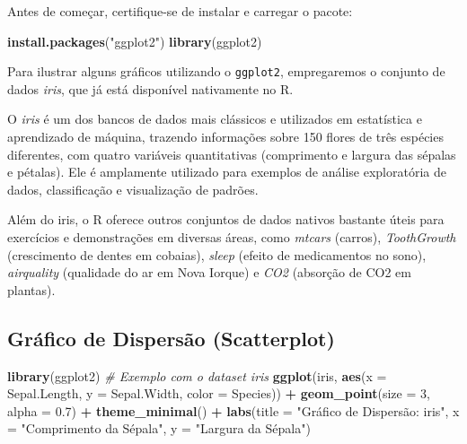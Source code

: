 \documentclass[
]{book}
\newenvironment{Shaded}{\begin{snugshade}}{\end{snugshade}}
\newcommand{\AttributeTok}[1]{\textcolor[rgb]{0.13,0.29,0.53}{#1}}
\newcommand{\CommentTok}[1]{\textcolor[rgb]{0.56,0.35,0.01}{\textit{#1}}}
\newcommand{\DecValTok}[1]{\textcolor[rgb]{0.00,0.00,0.81}{#1}}
\newcommand{\FloatTok}[1]{\textcolor[rgb]{0.00,0.00,0.81}{#1}}
\newcommand{\FunctionTok}[1]{\textcolor[rgb]{0.13,0.29,0.53}{\textbf{#1}}}
\newcommand{\NormalTok}[1]{#1}
\newcommand{\SpecialCharTok}[1]{\textcolor[rgb]{0.81,0.36,0.00}{\textbf{#1}}}
\newcommand{\StringTok}[1]{\textcolor[rgb]{0.31,0.60,0.02}{#1}}
\begin{document}
Antes de começar, certifique-se de instalar e carregar o pacote:

\begin{Shaded}
\begin{Highlighting}[]
\FunctionTok{install.packages}\NormalTok{(}\StringTok{"ggplot2"}\NormalTok{)}
\FunctionTok{library}\NormalTok{(ggplot2)}
\end{Highlighting}
\end{Shaded}

Para ilustrar alguns gráficos utilizando o \texttt{ggplot2}, empregaremos o conjunto de dados \emph{iris}, que já está disponível nativamente no R.

O \emph{iris} é um dos bancos de dados mais clássicos e utilizados em estatística e aprendizado de máquina, trazendo informações sobre 150 flores de três espécies diferentes, com quatro variáveis quantitativas (comprimento e largura das sépalas e pétalas). Ele é amplamente utilizado para exemplos de análise exploratória de dados, classificação e visualização de padrões.

Além do iris, o R oferece outros conjuntos de dados nativos bastante úteis para exercícios e demonstrações em diversas áreas, como \emph{mtcars} (carros), \emph{ToothGrowth} (crescimento de dentes em cobaias), \emph{sleep} (efeito de medicamentos no sono), \emph{airquality} (qualidade do ar em Nova Iorque) e \emph{CO2} (absorção de CO2 em plantas).

\subsection{Gráfico de Dispersão (Scatterplot)}\label{gruxe1fico-de-dispersuxe3o-scatterplot}

\begin{Shaded}
\begin{Highlighting}[]
\FunctionTok{library}\NormalTok{(ggplot2)}
\CommentTok{\# Exemplo com o dataset iris}
\FunctionTok{ggplot}\NormalTok{(iris, }\FunctionTok{aes}\NormalTok{(}\AttributeTok{x =}\NormalTok{ Sepal.Length, }\AttributeTok{y =}\NormalTok{ Sepal.Width, }\AttributeTok{color =}\NormalTok{ Species)) }\SpecialCharTok{+}
  \FunctionTok{geom\_point}\NormalTok{(}\AttributeTok{size =} \DecValTok{3}\NormalTok{, }\AttributeTok{alpha =} \FloatTok{0.7}\NormalTok{) }\SpecialCharTok{+}
  \FunctionTok{theme\_minimal}\NormalTok{() }\SpecialCharTok{+}
  \FunctionTok{labs}\NormalTok{(}\AttributeTok{title =} \StringTok{"Gráfico de Dispersão: iris"}\NormalTok{,}
       \AttributeTok{x =} \StringTok{"Comprimento da Sépala"}\NormalTok{,}
       \AttributeTok{y =} \StringTok{"Largura da Sépala"}\NormalTok{)}
\end{Highlighting}
\end{Shaded}
\end{document}
